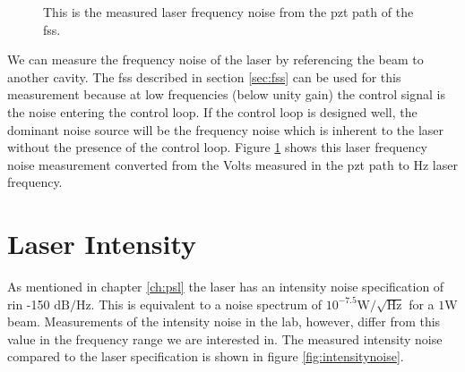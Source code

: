 \begin{figure}
  \caption[Frequency Noise]{This is the measured laser frequency noise
    from the \ac{pzt} path of the \ac{fss}.
    }
  \label{fig:frequencynoise}
\end{figure}

We can measure the frequency noise of the laser by referencing the beam to
another cavity. The \ac{fss} described in section \ref{sec:fss} can be used
for this measurement because at low frequencies (below unity gain) the control
signal is the noise entering the control loop.
If the control loop is designed well, the dominant noise source will be the
frequency noise which is inherent to the laser without the presence of the
control loop.
Figure \ref{fig:frequencynoise} shows this laser frequency noise measurement
converted from the Volts measured in the \ac{pzt} path to Hz laser frequency.




\section{Laser Intensity}

As mentioned in chapter \ref{ch:psl} the laser has an intensity noise
specification of \ac{rin} -150 $\mathrm{dB}/\mathrm{Hz}$. This is equivalent to a noise
spectrum of $10^{-7.5} \mathrm{W}/\sqrt{\mathrm{Hz}}$ for a $1 \mathrm{W}$ beam.
Measurements of the intensity noise in the lab, however, differ from this
value in the frequency range we are interested in.
The measured intensity noise compared to the laser specification is shown
in figure \ref{fig:intensitynoise}.

